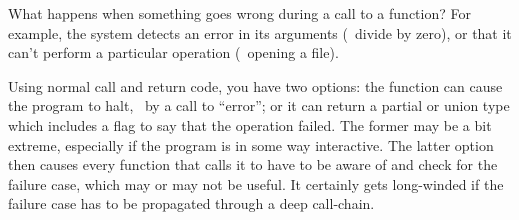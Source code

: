 %
%
%
%
%
%
\newcommand{\SrcQuote}[1]{``{\tt #1}''}

What happens when something goes wrong during a call to a function?
For example, the system detects an error in its arguments (\eg{}~divide
by zero), or that it can't perform a particular operation (\eg{}~opening
a file).

Using normal call and return code, you have two options:
the function can cause the program to halt, \eg{}~by a call to
``error''; or it can return a partial or union type which includes a flag to
say that the operation failed.
The former may be a bit extreme, especially if the program is in some
way interactive.
The latter option then causes every function that calls it to have to
be aware of and check for the failure case, which may or may not be useful.  It
certainly gets long-winded if the failure case has to be propagated
through a deep call-chain.

